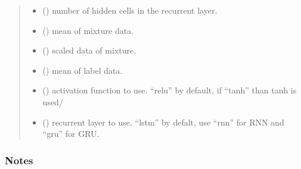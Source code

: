 \documentclass[letterpaper,10pt,english,openany,oneside]{sphinxmanual}
\begin{document}
\begin{fulllineitems}
\begin{quote}
\begin{description}
\begin{itemize}
\item {} 
 () \textendash{} number of hidden cells in the recurrent layer.

\item {} 
 (\sphinxstyleliteralemphasis{\sphinxupquote{, }}\sphinxstyleliteralemphasis{\sphinxupquote{(}}\sphinxstyleliteralemphasis{\sphinxupquote{)}}) \textendash{} mean of mixture data.

\item {} 
 (\sphinxstyleliteralemphasis{\sphinxupquote{, }}\sphinxstyleliteralemphasis{\sphinxupquote{(}}\sphinxstyleliteralemphasis{\sphinxupquote{)}}) \textendash{} scaled data of mixture.

\item {} 
 (\sphinxstyleliteralemphasis{\sphinxupquote{, }}\sphinxstyleliteralemphasis{\sphinxupquote{(}}\sphinxstyleliteralemphasis{\sphinxupquote{)}}) \textendash{} mean of label data.

\item {} 
 () \textendash{} activation function to use. “relu” by default, if “tanh” than tanh is used/

\item {} 
 () \textendash{} recurrent layer to use. “lstm” by defalt, use “rnn” for RNN and “gru” for GRU.

\end{itemize}

\end{description}\end{quote}
\subsubsection*{Notes}


\end{fulllineitems}
\end{document}
